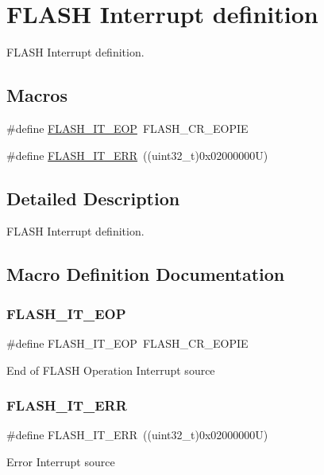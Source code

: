 \hypertarget{group___f_l_a_s_h___interrupt__definition}{}\section{F\+L\+A\+SH Interrupt definition}
\label{group___f_l_a_s_h___interrupt__definition}


F\+L\+A\+SH Interrupt definition.  


\subsection*{Macros}
\begin{DoxyCompactItemize}
\item 
\#define \mbox{\hyperlink{group___f_l_a_s_h___interrupt__definition_gaea20e80e1806d58a7544cfe8659e7f11}{F\+L\+A\+S\+H\+\_\+\+I\+T\+\_\+\+E\+OP}}~F\+L\+A\+S\+H\+\_\+\+C\+R\+\_\+\+E\+O\+P\+IE
\item 
\#define \mbox{\hyperlink{group___f_l_a_s_h___interrupt__definition_ga4e2c23ab8c1b9a5ee49bf6d695d9ae8c}{F\+L\+A\+S\+H\+\_\+\+I\+T\+\_\+\+E\+RR}}~((uint32\+\_\+t)0x02000000\+U)
\end{DoxyCompactItemize}


\subsection{Detailed Description}
F\+L\+A\+SH Interrupt definition. 



\subsection{Macro Definition Documentation}
\mbox{\label{group___f_l_a_s_h___interrupt__definition_gaea20e80e1806d58a7544cfe8659e7f11}} 
\subsubsection{\texorpdfstring{FLASH\_IT\_EOP}{FLASH\_IT\_EOP}}
{\footnotesize\ttfamily \#define F\+L\+A\+S\+H\+\_\+\+I\+T\+\_\+\+E\+OP~F\+L\+A\+S\+H\+\_\+\+C\+R\+\_\+\+E\+O\+P\+IE}

End of F\+L\+A\+SH Operation Interrupt source \mbox{\label{group___f_l_a_s_h___interrupt__definition_ga4e2c23ab8c1b9a5ee49bf6d695d9ae8c}} 
\subsubsection{\texorpdfstring{FLASH\_IT\_ERR}{FLASH\_IT\_ERR}}
{\footnotesize\ttfamily \#define F\+L\+A\+S\+H\+\_\+\+I\+T\+\_\+\+E\+RR~((uint32\+\_\+t)0x02000000\+U)}

Error Interrupt source 